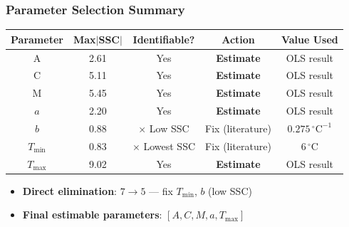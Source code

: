 \documentclass[10pt,aspectratio=169]{beamer}
\begin{document}
\begin{frame}
	\frametitle{Parameter Selection Summary}
	\begin{table}[ht]
		\centering
		\footnotesize
		\begin{tabular}{ccccc}
			\toprule
			Parameter & Max$|$SSC$|$ & Identifiable? & Action & Value Used \\
			\midrule
			A & 2.61 & \checkmark Yes & \textbf{Estimate} & OLS result \\
			C & 5.11 & \checkmark Yes & \textbf{Estimate} & OLS result \\
			M & 5.45 & \checkmark Yes & \textbf{Estimate} & OLS result \\
			$a$ & 2.20 & \checkmark Yes & \textbf{Estimate} & OLS result \\
			$b$ & 0.88 & $\times$ Low SSC & Fix (literature) & $0.275\,{}^{\circ}\text{C}^{-1}$ \\
			$T_{\min}$ & 0.83 & $\times$ Lowest SSC & Fix (literature) & $6\,{}^{\circ}\text{C}$ \\
			$T_{\max}$ & 9.02 & \checkmark Yes & \textbf{Estimate} & OLS result \\
			\bottomrule
		\end{tabular}
	\end{table}
	\vspace{0.3em}
	\begin{itemize}
		\item \textbf{Direct elimination}: $7 \to 5$ — fix $T_{\min}$, $b$ (low SSC)
		\item \textbf{Final estimable parameters}: $[A, C, M, a, T_{\max}]$
	\end{itemize}
\end{frame}

\end{document}

